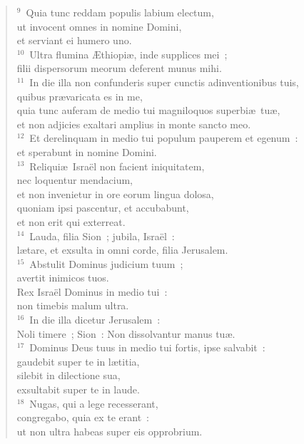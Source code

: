 \begin{flushleft}\begin{verse}${}^{9}$~Quia tunc reddam populis labium electum,\\ ut invocent omnes in nomine Domini,\\ et serviant ei humero uno.\\
${}^{10}$~Ultra flumina \AE thiopi\ae , inde supplices mei~;\\ filii dispersorum meorum deferent munus mihi.\\
${}^{11}$~In die illa non confunderis super cunctis adinventionibus tuis,\\ quibus pr\ae varicata es in me,\\ quia tunc auferam de medio tui magniloquos superbi\ae\ tu\ae ,\\ et non adjicies exaltari amplius in monte sancto meo.\\
${}^{12}$~Et derelinquam in medio tui populum pauperem et egenum~:\\ et sperabunt in nomine Domini.\\
${}^{13}$~Reliqui\ae\ Isra\"el non facient iniquitatem,\\ nec loquentur mendacium,\\ et non invenietur in ore eorum lingua dolosa,\\ quoniam ipsi pascentur, et accubabunt,\\ et non erit qui exterreat.\\
${}^{14}$~Lauda, filia Sion~; jubila, Isra\"el~:\\ l\ae tare, et exsulta in omni corde, filia Jerusalem.\\
${}^{15}$~Abstulit Dominus judicium tuum~;\\ avertit inimicos tuos.\\ Rex Isra\"el Dominus in medio tui~:\\ non timebis malum ultra.\\
${}^{16}$~In die illa dicetur Jerusalem~:\\ Noli timere~; Sion~: Non dissolvantur manus tu\ae .\\
${}^{17}$~Dominus Deus tuus in medio tui fortis, ipse salvabit~:\\ gaudebit super te in l\ae titia,\\ silebit in dilectione sua,\\ exsultabit super te in laude.\\
${}^{18}$~Nugas, qui a lege recesserant,\\ congregabo, quia ex te erant~:\\ ut non ultra habeas super eis opprobrium.\\

\end{verse}
\end{flushleft}
